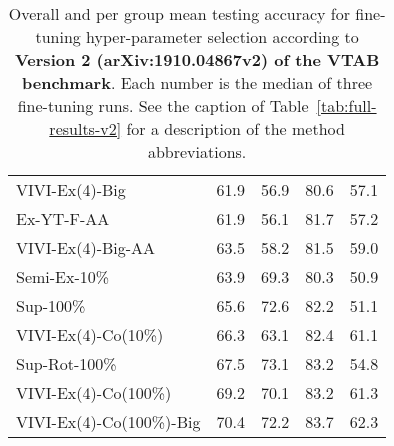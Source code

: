\documentclass[10pt,twocolumn,letterpaper]{article}
\begin{document}
\begin{table*}[h!]
\begin{tabular}{lrrrr}
VIVI-Ex(4)-Big          &     61.9 &     56.9 &        80.6 &       57.1 \\
Ex-YT-F-AA              &     61.9 &     56.1 &        81.7 &       57.2 \\
VIVI-Ex(4)-Big-AA       &     63.5 &     58.2 &        81.5 &       59.0 \\
Semi-Ex-10\%             &     63.9 &     69.3 &        80.3 &       50.9 \\
Sup-100\%                &     65.6 &     72.6 &        82.2 &       51.1 \\
VIVI-Ex(4)-Co(10\%)      &     66.3 &     63.1 &        82.4 &       61.1 \\
Sup-Rot-100\%            &     67.5 &     73.1 &        83.2 &       54.8 \\
VIVI-Ex(4)-Co(100\%)     &     69.2 &     70.1 &        83.2 &       61.3 \\
VIVI-Ex(4)-Co(100\%)-Big &     70.4 &     72.2 &        83.7 &       62.3 \\
\bottomrule
\end{tabular}     \caption{Overall and per group mean testing accuracy for fine-tuning hyper-parameter selection according to {\bf Version 2 (arXiv:1910.04867v2) of the VTAB benchmark}. Each number is the median of three fine-tuning runs. See the caption of Table~\ref{tab:full-results-v2} for a description of the method abbreviations.}
    \label{tab:per-group-results-v2}
\end{table*}
\end{document}
